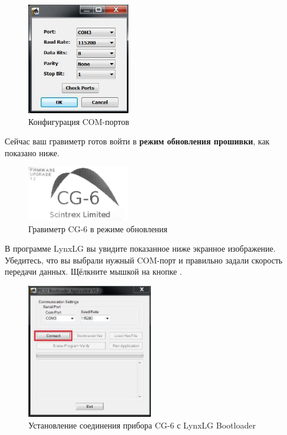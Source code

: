 \begin{figure}[H]
  \centering
  \includegraphics[width=0.4\textwidth]{figures/com_port_configuration}
  \caption{Конфигурация COM-портов}
  \label{fig:com_port_configuration}
\end{figure}

Сейчас ваш гравиметр \cg{} готов войти в \textbf{режим обновления прошивки}, как
показано ниже.

\begin{figure}[H]
  \centering
  \includegraphics[width=0.4\textwidth]{figures/the_cg6_in_upgrade_mode}
  \caption{Гравиметр CG-6 в режиме обновления}
  \label{fig:the_cg6_in_upgrade_mode}
\end{figure}


В программе LynxLG вы увидите показанное ниже экранное изображение. Убедитесь,
что вы выбрали нужный COM-порт и правильно задали скорость передачи данных.
Щёлкните мышкой на кнопке .

\begin{figure}[H]
  \centering
  \includegraphics[width=0.49\textwidth]{figures/connecting_the_cg6_with_lynxlg_bootloader}
  \caption{Установление соединения прибора CG-6 с LynxLG Bootloader}
  \label{fig:connecting_the_cg6_with_lynxlg_bootloader}
\end{figure}

